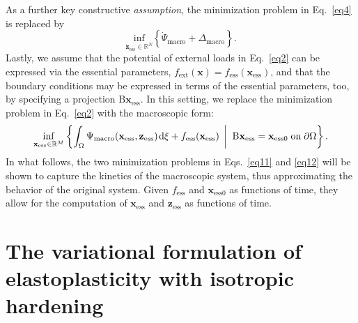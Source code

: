\documentclass[final,1p,times]{elsarticle}
\newcommand{\be}{\begin{equation}}
\newcommand{\ee}{\end{equation}}
\newcommand{\bfm}[1]{ \mathbf{#1} }
\def\dd{\;\!\mathrm{d}}
\renewcommand{\inf}[3]{
\underset{#1}{\mathrm{inf}}\left\lbrace #2 \; \left| \vphantom{#2}\vphantom{#3} \right. \; #3 \right\rbrace
}
\newcommand{\infr}[2]{
\underset{#1}{\mathrm{inf}}\left\lbrace #2 \right\rbrace
}
\begin{document}
As a further key constructive \emph{assumption}, the minimization problem in Eq.\  \eqref{eq4} is replaced by
\be
\label{eq11}
\infr{\dot{\bfm{z}}_\mathrm{ess} \in \mathbb{R}^N}{\dot{\Psi}_\mathrm{macro} +  \Delta_\mathrm{macro}}.
\ee
Lastly, we assume that the potential of external loads in Eq.\  \eqref{eq2} can be expressed via the essential parameters, $f_\mathrm{ext}(\bfm{x}) = f_\mathrm{ess}(\bfm{x}_\mathrm{ess})$, and that the boundary conditions may be expressed in terms of the essential parameters, too, by specifying a projection $\mathrm{B}\bfm{x}_\mathrm{ess}$.   In this setting, we replace the minimization problem in Eq.\  \eqref{eq2} with the macroscopic form:
\be
\label{eq12}
\inf{\bfm{x}_\mathrm{ess} \in \mathbb{R}^M}{\int_\Omega \Psi_\mathrm{macro}(\bfm{x}_\mathrm{ess},\bfm{z}_\mathrm{ess}) \dd\xi + f_\mathrm{ess}(\bfm{x}_\mathrm{ess})}{\mathrm{B}\bfm{x}_\mathrm{ess}=\bfm{x}_{\mathrm{ess}0} \;\mbox{on}\; \partial\Omega}.
\ee
In what follows, the two minimization problems in Eqs.\  \eqref{eq11} and \eqref{eq12} will be shown to capture the kinetics  of the macroscopic system, thus approximating the behavior of the original system. Given $f_\mathrm{ess}$ and $\bfm{x}_{\mathrm{ess}0}$ as functions of time, they allow for the computation of $\bfm{x}_\mathrm{ess}$ and $\bfm{z}_\mathrm{ess}$ as functions of time.

\section{The variational formulation of elastoplasticity with isotropic hardening}\label{sec:3}
\end{document}
